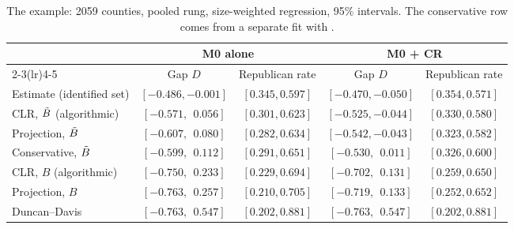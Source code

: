 \begin{table}[t]
\centering\small
\begin{tabular}{@{}lcccc@{}}
\toprule
& \multicolumn{2}{c}{M0 alone} & \multicolumn{2}{c}{M0 + CR} \\
\cmidrule(lr){2-3}\cmidrule(lr){4-5}
& Gap $D$ & Republican rate & Gap $D$ & Republican rate \\
\midrule
Estimate (identified set) & $[-0.486,-0.001]$ & $[0.345,0.597]$ & $[-0.470,-0.050]$ & $[0.354,0.571]$ \\
CLR, $\tilde B$ (algorithmic) & $[-0.571,\ \ 0.056]$ & $[0.301,0.623]$ & $[-0.525,-0.044]$ & $[0.330,0.580]$ \\
Projection, $\tilde B$ & $[-0.607,\ \ 0.080]$ & $[0.282,0.634]$ & $[-0.542,-0.043]$ & $[0.323,0.582]$ \\
Conservative, $\tilde B$ & $[-0.599,\ \ 0.112]$ & $[0.291,0.651]$ & $[-0.530,\ \ 0.011]$ & $[0.326,0.600]$ \\
CLR, $B$ (algorithmic) & $[-0.750,\ \ 0.233]$ & $[0.229,0.694]$ & $[-0.702,\ \ 0.131]$ & $[0.259,0.650]$ \\
Projection, $B$ & $[-0.763,\ \ 0.257]$ & $[0.210,0.705]$ & $[-0.719,\ \ 0.133]$ & $[0.252,0.652]$ \\
Duncan--Davis & $[-0.763,\ \ 0.547]$ & $[0.202,0.881]$ & $[-0.763,\ \ 0.547]$ & $[0.202,0.881]$ \\
\bottomrule
\end{tabular}
\caption{The  example: 2059 counties, pooled rung, size-weighted regression, 95\% intervals. The conservative row comes from a separate fit with .}\label{tab:vv}
\end{table}

